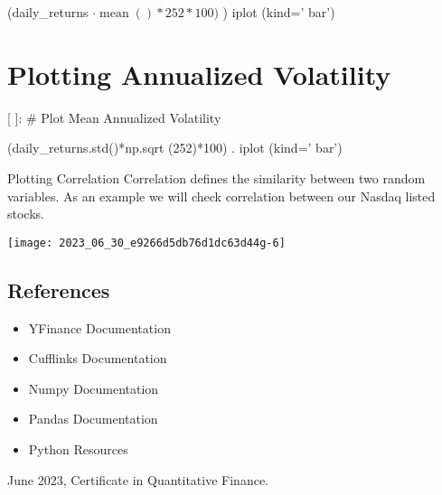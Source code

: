 \documentclass[10pt]{article}
\begin{document}
(daily\_returns $\cdot \operatorname{mean}() * 252 * 100)$ ) iplot (kind=' bar')

\section*{Plotting Annualized Volatility}
[ ]: \# Plot Mean Annualized Volatility

(daily\_returns.std()*np.sqrt (252)*100) . iplot (kind=' bar')

Plotting Correlation Correlation defines the similarity between two random variables. As an example we will check correlation between our Nasdaq listed stocks.

\begin{center}
\texttt{[image: 2023\_06\_30\_e9266d5db76d1dc63d44g-6]}
\end{center}

\subsection*{References}
\begin{itemize}
  \item YFinance Documentation

  \item Cufflinks Documentation

  \item Numpy Documentation

  \item Pandas Documentation

  \item Python Resources

\end{itemize}

June 2023, Certificate in Quantitative Finance.
\end{document}
